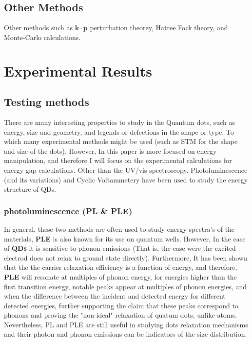 \documentclass[twoside,11pt]{article}
\begin{document}
    \subsection{Other Methods}
    Other methods such as $\mathbf{k\cdot p}$ perturbation theorey, Hatree Fock theory, and Monte-Carlo calculations.

\section{Experimental Results}
    \subsection{Testing methods}
    There are many interesting properties to study in the Quantum dots, such as energy, size and geometry, and legends or defections in the shape or type. To which many experimental methods might be used (such as STM for the shape and size of the dots). However, In this paper is more focused on energy manipulation, and therefore I will focus on the experimental calculations for energy gap calculations. Other than the UV/vis-spectroscopy. Photoluminescence (and its variations) and Cyclic Voltammetery have been used to study the energy structure of QDs.
        
        \subsubsection{photoluminescence (PL \& PLE)}
        In general, these two methods are often used to study energy spectra's of the materials, \textbf{PLE} is also known for its use on quantum wells. However, In the case of \textbf{QDs} it is sensitive to phonon emissions (That is, the case were the excited electrod does not relax to ground state directly). Furthermore, It has been shown that the the carrier relaxation efficiency is a function of energy, and therefore, \textbf{PLE} will resonate at multiples of phonon energy, for energies higher than the first transition energy, notable peaks appear at multiples of phonon energies, and when the difference between the incident and detected energy for different detected energies, further supporting the claim that these peaks correspond to phonons and proving the "non-ideal" relaxation of quatum dots, unlike atoms. Nevertheless, PL and PLE are still useful in studying dots relaxation mechanisms and their photon and phonon emissions can be indicators of the size distribution. \cite{steer1996electronic}
\end{document}
